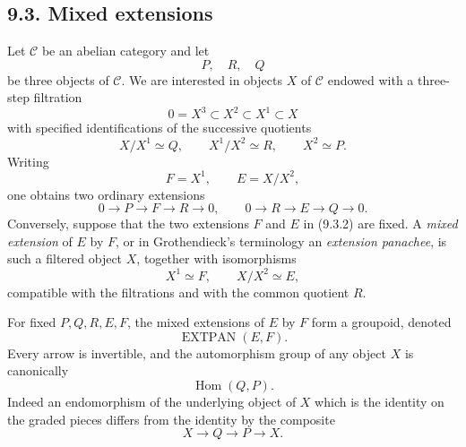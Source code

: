 \documentclass[11pt]{article}
\newcommand{\Hom}{\operatorname{Hom}}
\newcommand{\EXTPAN}{\operatorname{EXTPAN}}
\newcommand{\calC}{\mathcal C}
\begin{document}
\subsection*{9.3. Mixed extensions}
Let \(\calC\) be an abelian category and let
\begin{equation}\tag{9.3.1}
        P,
        \quad R,
        \quad Q
\end{equation}
be three objects of \(\calC\).  We are interested in objects \(X\) of \(\calC\) endowed with a three-step filtration
\[
        0=X^3\subset X^2\subset X^1\subset X
\]
with specified identifications of the successive quotients
\[
        X/X^1\simeq Q,
        \qquad X^1/X^2\simeq R,
        \qquad X^2\simeq P.
\]
Writing
\[
        F=X^1,
        \qquad E=X/X^2,
\]
one obtains two ordinary extensions
\begin{equation}\tag{9.3.2}
        0\to P\to F\to R\to0,
        \qquad
        0\to R\to E\to Q\to0.
\end{equation}
Conversely, suppose that the two extensions \(F\) and \(E\) in (9.3.2) are fixed.  A \emph{mixed extension} of \(E\) by \(F\), or in Grothendieck's terminology an \emph{extension panachee}, is such a filtered object \(X\), together with isomorphisms
\begin{equation}\tag{9.3.3}
        X^1\simeq F,
        \qquad X/X^2\simeq E,
\end{equation}
compatible with the filtrations and with the common quotient \(R\).

For fixed \(P,Q,R,E,F\), the mixed extensions of \(E\) by \(F\) form a groupoid, denoted
\[
        \EXTPAN(E,F).
\]
Every arrow is invertible, and the automorphism group of any object \(X\) is canonically
\begin{equation}\tag{9.3.4}
        \Hom(Q,P).
\end{equation}
Indeed an endomorphism of the underlying object of \(X\) which is the identity on the graded pieces differs from the identity by the composite
\[
        X\longrightarrow Q\longrightarrow P\longrightarrow X .
\]
\end{document}
